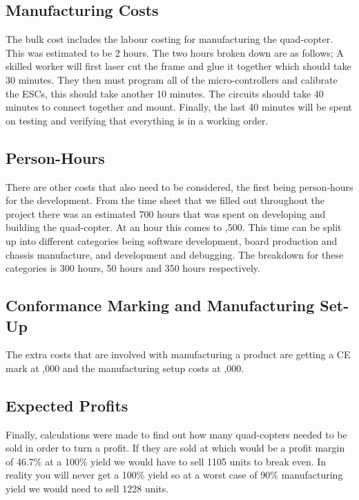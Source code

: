 \documentclass[a4paper,11pt]{article}
\begin{document}
\subsection{Manufacturing Costs}
The bulk cost includes the labour costing for manufacturing the quad-copter. This was estimated to be 2 hours. The two hours broken down are as follows; A skilled worker will first laser cut the frame and glue it together which should take 30 minutes. They then must program all of the micro-controllers and calibrate the ESCs, this should take another 10 minutes. The circuits should take 40 minutes to connect together and mount. Finally, the last 40 minutes will be spent on testing and verifying that everything is in a working order.\\
\subsection{Person-Hours}
There are other costs that also need to be considered, the first being person-hours for the development. From the time sheet that we filled out throughout the project there was an estimated 700 hours that was spent on developing and building the quad-copter. At  an hour this comes to ,500. This time can be split up into different categories being software development, board production and chassis manufacture, and development and debugging. The breakdown for these categories is 300 hours, 50 hours and 350 hours respectively.\\ 
\subsection{Conformance Marking and Manufacturing Set-Up}
The extra costs that are involved with manufacturing a product are getting a CE mark at ,000 and the manufacturing setup costs at ,000.\\
\subsection{Expected Profits}
Finally, calculations were made to find out how many quad-copters needed to be sold in order to turn a profit. If they are sold at  which would be a profit margin of 46.7\% at a 100\% yield we would have to sell 1105 units to break even. In reality you will never get a 100\% yield so at a worst case of 90\% manufacturing yield we would need to sell 1228 units.\\
\end{document}
